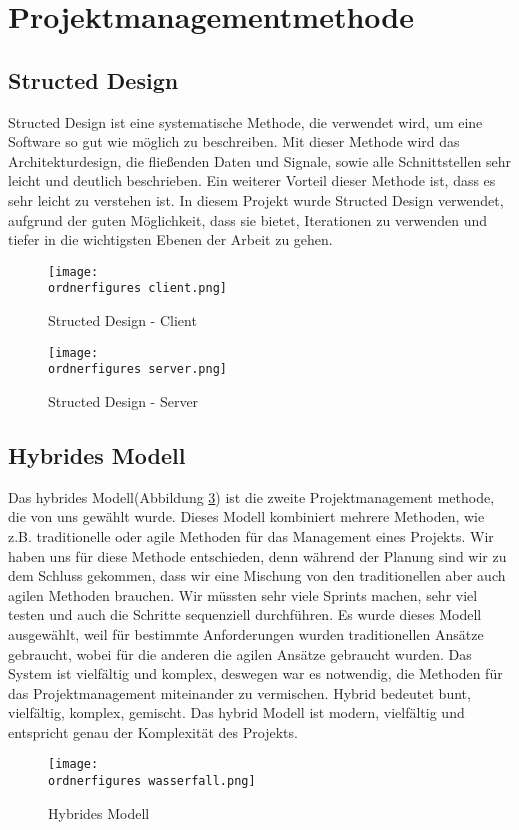 \section{Projektmanagementmethode}

\subsection{Structed Design}
Structed Design ist eine systematische Methode, die verwendet wird, um eine Software so gut wie m\"{o}glich zu beschreiben. Mit dieser Methode wird das Architekturdesign, die flie\ss{}enden Daten und Signale, sowie alle Schnittstellen sehr leicht und deutlich beschrieben. Ein weiterer Vorteil dieser Methode ist, dass es sehr leicht zu verstehen ist. In diesem Projekt wurde Structed Design verwendet, aufgrund der guten M\"{o}glichkeit, dass sie bietet, Iterationen zu verwenden und tiefer in die wichtigsten Ebenen der Arbeit zu gehen. 



\begin{figure}[ht]
	\centering
	\texttt{[image: \\ordnerfigures
		client.png]}
	\caption{Structed Design - Client}
	\label{fi:sd-client}
\end{figure}



\begin{figure}[ht]
	
	\centering
	\texttt{[image: \\ordnerfigures
		server.png]}
	\caption{Structed Design - Server}
	\label{fi:sd-server}
\end{figure}


\subsection{Hybrides Modell}
Das hybrides Modell(Abbildung \ref{fi:hybrides}) ist die zweite Projektmanagement methode, die von uns gew\"ahlt wurde. Dieses Modell kombiniert mehrere Methoden, wie z.B. traditionelle oder agile Methoden f\"ur das Management eines Projekts. Wir haben uns für diese Methode entschieden, denn während der Planung sind wir zu dem Schluss gekommen, dass wir eine Mischung von den traditionellen aber auch agilen Methoden brauchen. Wir müssten sehr viele Sprints machen, sehr viel testen und auch die Schritte sequenziell durchführen. Es wurde dieses Modell ausgew\"ahlt, weil f\"ur bestimmte Anforderungen wurden traditionellen Ans\"atze gebraucht, wobei f\"ur die anderen die agilen Ans\"atze gebraucht wurden.  Das System ist vielf\"altig und komplex, deswegen war es notwendig, die Methoden f\"ur das Projektmanagement miteinander zu vermischen. Hybrid bedeutet bunt, vielf\"altig, komplex, gemischt. Das hybrid Modell ist modern, vielfältig und entspricht genau der Komplexität des Projekts.



\begin{figure}[h]
	\centering
	\texttt{[image: \\ordnerfigures
		wasserfall.png]}
	\caption{Hybrides Modell}
	\label{fi:hybrides}
\end{figure}



